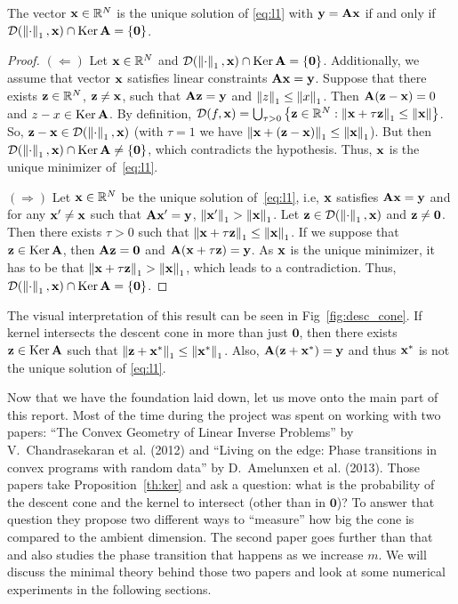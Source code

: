 \begin{proposition}
    The vector $\mathbf{x} \in \mathbb{R}^N$ is the unique solution of \ref{eq:l1} with $\mathbf{y} = \mathbf{A}\mathbf{x}$ if and only if
    $\mathcal{D}(\left\Vert\cdot\right\Vert_1, \mathbf{x}) \cap \operatorname{Ker} \mathbf{A} = \{\mathbf{0}\}$.
    \label{th:ker}
\end{proposition}

\begin{proof}
    $(\Leftarrow)$ Let $\mathbf{x} \in \mathbb{R}^N$ and $\mathcal{D}(\left\Vert\cdot\right\Vert_1, \mathbf{x}) \cap \operatorname{Ker} \mathbf{A} = \{\mathbf{0}\}$.
    Additionally, we assume that vector $\mathbf{x}$ satisfies linear constraints $\mathbf{A}\mathbf{x}=\mathbf{y}$.
    Suppose that there exists $\mathbf{z} \in \mathbb{R}^N$, $\mathbf{z} \neq \mathbf{x}$, such that $\mathbf{A}\mathbf{z}=\mathbf{y}$ and $\left\Vert z\right\Vert_1 \leq \left\Vert x\right\Vert_1$.
    Then $\mathbf{A}(\mathbf{z}-\mathbf{x})=0$ and $z-x \in \operatorname{Ker} \mathbf{A}$.
    By definition, $\mathcal{D}(f, \mathbf{x}) = \bigcup_{\tau > 0} \left\{ \mathbf{z} \in \mathbb{R}^N: \left\Vert\mathbf{x}+\tau \mathbf{z}\right\Vert_1 \leq \left\Vert\mathbf{x}\right\Vert \right\}$.
    So, $\mathbf{z} - \mathbf{x} \in \mathcal{D}(\left\Vert\cdot\right\Vert_1, \mathbf{x})$ (with $\tau = 1$ we have $\left\Vert\mathbf{x} + (\mathbf{z} - \mathbf{x})\right\Vert_1 \leq \left\Vert\mathbf{x}\right\Vert_1$).
    But then $\mathcal{D}(\left\Vert\cdot\right\Vert_1, \mathbf{x}) \cap \operatorname{Ker} \mathbf{A} \neq \{\mathbf{0}\}$, which contradicts the hypothesis.
    Thus, $\mathbf{x}$ is the unique minimizer of~\ref{eq:l1}.

    $(\Rightarrow)$ Let $\mathbf{x} \in \mathbb{R}^N$ be the unique solution of~\ref{eq:l1}, i.e, $\mathbf{x}$ satisfies $\mathbf{A}\mathbf{x}=\mathbf{y}$ and
    for any $\mathbf{x}' \neq \mathbf{x}$ such that $\mathbf{A} \mathbf{x}' = \mathbf{y}$, $\left\Vert\mathbf{x}'\right\Vert_1 > \left\Vert\mathbf{x}\right\Vert_1$.
    Let $\mathbf{z} \in \mathcal{D}(\left\Vert\cdot\right\Vert_1, \mathbf{x})$ and $\mathbf{z} \neq \mathbf{0}$.
    Then there exists $\tau > 0$ such that $\left\Vert\mathbf{x} + \tau \mathbf{z}\right\Vert_1 \leq \left\Vert\mathbf{x}\right\Vert_1 $.
    If we suppose that $\mathbf{z} \in \operatorname{Ker} \mathbf{A}$, then $\mathbf{A} \mathbf{z} = \mathbf{0}$ and $\mathbf{A}(\mathbf{x} + \tau \mathbf{z}) = \mathbf{y}$.
    As $\mathbf{x}$ is the unique minimizer, it has to be that $\left\Vert\mathbf{x} + \tau \mathbf{z}\right\Vert_1 > \left\Vert\mathbf{x}\right\Vert_1$, which leads to a contradiction.
    Thus, $\mathcal{D}(\left\Vert\cdot\right\Vert_1, \mathbf{x}) \cap \operatorname{Ker} \mathbf{A} = \{\mathbf{0}\}$.
\end{proof}

The visual interpretation of this result can be seen in Fig~\ref{fig:desc_cone}.
If kernel intersects the descent cone in more than just $\mathbf{0}$, then there exists $\mathbf{z} \in \operatorname{Ker}\mathbf{A}$ such that
$\left\Vert\mathbf{z}+\mathbf{x}^*\right\Vert_1 \leq \left\Vert\mathbf{x}^*\right\Vert_1$.
Also, $\mathbf{A} (\mathbf{z}+\mathbf{x}^*) = \mathbf{y}$ and thus $\mathbf{x}^*$ is not the unique solution of \ref{eq:l1}.

Now that we have the foundation laid down, let us move onto the main part of this report.
Most of the time during the project was spent on working with two papers: ``The Convex Geometry of Linear Inverse Problems''
by V.~Chandrasekaran et al. (2012) and ``Living on the edge: Phase transitions in convex programs with random data''
by D.~Amelunxen et al. (2013).
Those papers take Proposition~\ref{th:ker} and ask a question: what is the probability of the descent cone and the kernel
to intersect (other than in $\mathbf{0}$)?
To answer that question they propose two different ways to ``measure'' how big the cone is compared to the ambient
dimension.
The second paper goes further than that and also studies the phase transition that happens as we increase $m$.
We will discuss the minimal theory behind those two papers and look at some numerical experiments in the following sections.

